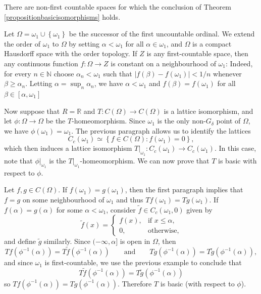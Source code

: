 \begin{example}
There are non-first countable spaces for which the conclusion of Theorem \ref{propositionbasicisomorphisms} holds.

Let $\Omega=\omega_1\cup\left\{\omega_1\right\}$ be the successor of the first uncountable ordinal. We extend the order of $\omega_1$ to $\Omega$ by setting $\alpha<\omega_1$ for all $\alpha\in\omega_1$, and $\Omega$ is a compact Hausdorff space with the order topology. If $Z$ is any first-countable space, then any continuous function $f:\Omega\to Z$ is constant on a neighbourhood of $\omega_1$: Indeed, for every $n\in\mathbb{N}$ choose $\alpha_n<\omega_1$ such that $|f(\beta)-f(\omega_1)|<1/n$ whenever $\beta\geq\alpha_n$. Letting $\alpha=\sup_n\alpha_n$, we have $\alpha<\omega_1$ and $f(\beta)=f(\omega_1)$ for all $\beta\in[\alpha,\omega_1]$

Now suppose that $R=\mathbb{R}$ and $T:C(\Omega)\to C(\Omega)$ is a lattice isomorphism, and let $\phi:\Omega\to\Omega$ be the $T$-homeomorphism. Since $\omega_1$ is the only non-$G_\delta$ point of $\Omega$, we have $\phi(\omega_1)=\omega_1$. The previous paragraph allows us to identify the lattices
\[C_c(\omega_1)\simeq\left\{f\in C(\Omega):f(\omega_1)=0\right\},\]
which then induces a lattice isomorphism $T|_{\omega_1}:C_c(\omega_1)\to C_c(\omega_1)$. In this case, note that $\phi|_{\omega_1}$ is the $T|_{\omega_1}$-homeomorphism. We can now prove that $T$ is basic with respect to $\phi$.

Let $f,g\in C(\Omega)$. If $f(\omega_1)=g(\omega_1)$, then the first paragraph implies that $f=g$ on some neighbourhood of $\omega_1$ and thus $Tf(\omega_1)=Tg(\omega_1)$. If $f(\alpha)=g(\alpha)$ for some $\alpha<\omega_1$, consider $\widetilde{f}\in C_c(\omega_1,0)$ given by
\[\widetilde{f}(x)=\begin{cases}
f(x),&\text{if }x\leq\alpha,\\
0,&\text{otherwise,}\end{cases}\]
and define $\widetilde{g}$ similarly. Since $(-\infty,\alpha]$ is open in $\Omega$, then
\[Tf(\phi^{-1}(\alpha))=T\widetilde{f}(\phi^{-1}(\alpha))\qquad\text{and}\qquad Tg(\phi^{-1}(\alpha))=T\widetilde{g}(\phi^{-1}(\alpha)),\]
and since $\omega_1$ is first-countable, we use the previous example to conclude that
\[T\widetilde{f}(\phi^{-1}(\alpha))=T\widetilde{g}(\phi^{-1}(\alpha))\]
so $Tf(\phi^{-1}(\alpha))=Tg(\phi^{-1}(\alpha))$. Therefore $T$ is basic (with respect to $\phi$).
\end{example}

